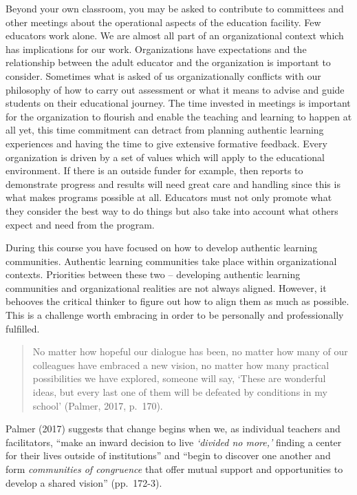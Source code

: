 \documentclass[
]{book}
\begin{document}
Beyond your own classroom, you may be asked to contribute to committees and other meetings about the operational aspects of the education facility. Few educators work alone. We are almost all part of an organizational context which has implications for our work. Organizations have expectations and the relationship between the adult educator and the organization is important to consider. Sometimes what is asked of us organizationally conflicts with our philosophy of how to carry out assessment or what it means to advise and guide students on their educational journey. The time invested in meetings is important for the organization to flourish and enable the teaching and learning to happen at all yet, this time commitment can detract from planning authentic learning experiences and having the time to give extensive formative feedback. Every organization is driven by a set of values which will apply to the educational environment. If there is an outside funder for example, then reports to demonstrate progress and results will need great care and handling since this is what makes programs possible at all. Educators must not only promote what they consider the best way to do things but also take into account what others expect and need from the program.

During this course you have focused on how to develop authentic learning communities. Authentic learning communities take place within organizational contexts. Priorities between these two -- developing authentic learning communities and organizational realities are not always aligned. However, it behooves the critical thinker to figure out how to align them as much as possible. This is a challenge worth embracing in order to be personally and professionally fulfilled.

\begin{quote}
No matter how hopeful our dialogue has been, no matter how many of our colleagues have embraced a new vision, no matter how many practical possibilities we have explored, someone will say, `These are wonderful ideas, but every last one of them will be defeated by conditions in my school' (Palmer, 2017, p.~170).
\end{quote}

Palmer (2017) suggests that change begins when we, as individual teachers and facilitators, ``make an inward decision to live \emph{`divided no more,'} finding a center for their lives outside of institutions'' and ``begin to discover one another and form \emph{communities of congruence} that offer mutual support and opportunities to develop a shared vision'' (pp.~172-3).
\end{document}
